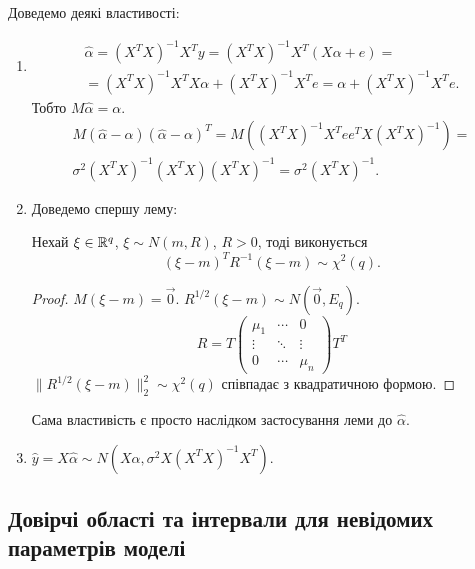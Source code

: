 Доведемо деякі властивості:
\begin{enumerate}
	\item 
	\begin{multline*} 
		\widehat{\alpha} = (X^TX)^{-1}X^Ty = (X^TX)^{-1}X^T(X\alpha+e) = \\
		= (X^TX)^{-1}X^TX\alpha + (X^TX)^{-1}X^Te = \alpha + (X^TX)^{-1}X^Te.
	\end{multline*}
	Тобто $M\widehat{\alpha} = \alpha$. 
	\begin{multline*} 
		M(\widehat{\alpha}-\alpha)(\widehat{\alpha}-\alpha)^T = M((X^TX)^{-1}X^Tee^TX(X^TX)^{-1}) = \\
		\sigma^2 (X^TX)^{-1}(X^TX)(X^TX)^{-1} = \sigma^2 (X^TX)^{-1}.
	\end{multline*}

	\item Доведемо спершу лему:
	\begin{lemma}
		Нехай $\xi \in \mathbb{R}^q$, $\xi \sim N(m, R)$, $R > 0$, тоді виконується \[ (\xi-m)^TR^{-1}(\xi-m)\sim\chi^2(q).\]
	\end{lemma}
	\begin{proof}
		$M(\xi-m)=\vec0$. $R^{1/2}(\xi - m)\sim N(\vec0,E_q)$. \[R = T \begin{pmatrix} \mu_1 & \cdots & 0 \\ \vdots & \ddots & \vdots \\ 0 & \cdots & \mu_n \end{pmatrix} T^T\] $\|R^{1/2}(\xi-m)\|_2^2 \sim \chi^2(q)$ співпадає з квадратичною формою.
	\end{proof}

	Сама властивість є просто наслідком застосування леми до $\widehat{\alpha}$.

	\item $\widehat{y} = X \widehat{\alpha} \sim N(X\alpha, \sigma^2X(X^TX)^{-1}X^T)$.
\end{enumerate}

\subsection{Довірчі області та інтервали для невідомих параметрів моделі}

